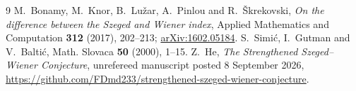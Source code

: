 \documentclass[11pt,a4paper]{article}
\theoremstyle{plain}
\theoremstyle{definition}
\theoremstyle{remark}
\begin{document}
\begin{thebibliography}{9}
M.~Bonamy, M.~Knor, B.~Lu\v{z}ar, A.~Pinlou and R.~\v{S}krekovski,
\emph{On the difference between the Szeged and Wiener index},
Applied Mathematics and Computation \textbf{312} (2017), 202--213;
\href{https://arxiv.org/abs/1602.05184}{arXiv:1602.05184}.
S.~Simi\'c, I.~Gutman and V.~Balti\'c,
Math. Slovaca \textbf{50} (2000), 1--15.
Z.~He, \emph{The Strengthened Szeged--Wiener Conjecture},
unrefereed manuscript posted 8 September 2026,
\url{https://github.com/FDmd233/strengthened-szeged-wiener-conjecture}.
\end{thebibliography}
\end{document}
